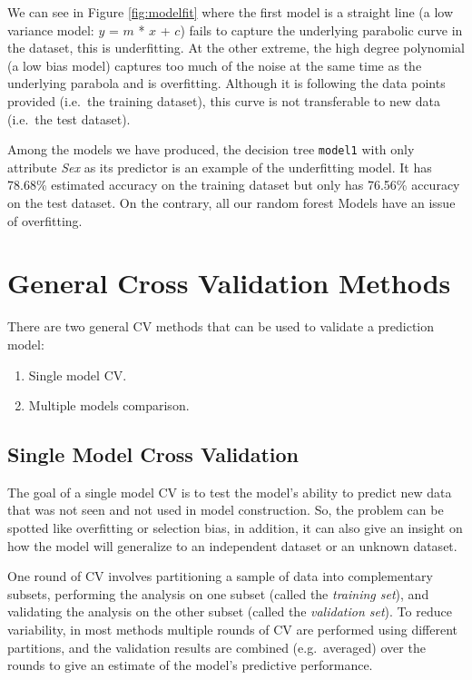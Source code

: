 \documentclass[
]{book}
\providecommand{\tightlist}{%
  \setlength{\itemsep}{0pt}\setlength{\parskip}{0pt}}
\begin{document}
We can see in Figure \ref{fig:modelfit} where the first model is a straight line (a low variance model: \(y\) = \(m\) * \(x\) + \(c\)) fails to capture the underlying parabolic curve in the dataset, this is underfitting. At the other extreme, the high degree polynomial (a low bias model) captures too much of the noise at the same time as the underlying parabola and is overfitting. Although it is following the data points provided (i.e.~the training dataset), this curve is not transferable to new data (i.e.~the test dataset).

Among the models we have produced, the decision tree \texttt{model1} with only attribute \emph{Sex} as its predictor is an example of the underfitting model. It has 78.68\% estimated accuracy on the training dataset but only has 76.56\% accuracy on the test dataset. On the contrary, all our random forest Models have an issue of overfitting.

\hypertarget{general-cross-validation-methods}{%
\section{General Cross Validation Methods}\label{general-cross-validation-methods}}

There are two general CV methods that can be used to validate a prediction model:

\begin{enumerate}
\def\labelenumi{\arabic{enumi}.}
\tightlist
\item
  Single model CV.
\item
  Multiple models comparison.
\end{enumerate}

\hypertarget{single-model-cross-validation}{%
\subsection*{Single Model Cross Validation}\label{single-model-cross-validation}}


The goal of a single model CV is to test the model's ability to predict new data that was not seen and not used in model construction. So, the problem can be spotted like overfitting or selection bias, in addition, it can also give an insight on how the model will generalize to an independent dataset or an unknown dataset.

One round of CV involves partitioning a sample of data into complementary subsets, performing the analysis on one subset (called the \emph{training set}), and validating the analysis on the other subset (called the \emph{validation set}). To reduce variability, in most methods multiple rounds of CV are performed using different partitions, and the validation results are combined (e.g.~averaged) over the rounds to give an estimate of the model's predictive performance.
\end{document}
